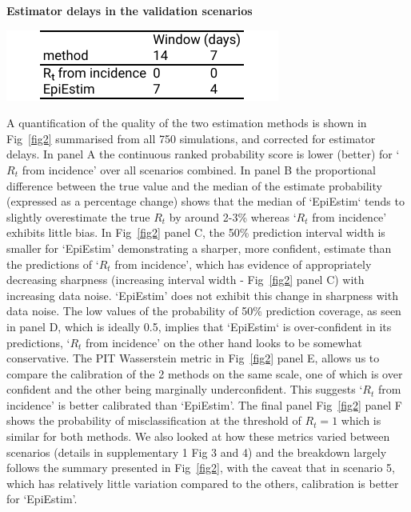 \documentclass[10pt,letterpaper]{article}
\begin{document}
\begin{table}[!ht]
\caption{{\bf Estimator delays in the validation scenarios}}
\centerline{\includegraphics{fig/tab1-lags}}
\label{tab1}
\end{table}

A quantification of the quality of the two estimation methods is shown in Fig~\ref{fig2} summarised from all 750 simulations, and corrected for estimator delays. In panel A the continuous ranked probability score is lower (better) for `$R_t$ from incidence' over all scenarios combined. In panel B the proportional difference between the true value and the median of the estimate probability (expressed as a percentage change) shows that the median of `EpiEstim` tends to slightly overestimate the true $R_t$ by around 2-3\% whereas `$R_t$ from incidence' exhibits little bias. In Fig~\ref{fig2} panel C, the 50\% prediction interval width is smaller for `EpiEstim' demonstrating a sharper, more confident, estimate than the predictions of `$R_t$ from incidence', which has evidence of appropriately decreasing sharpness (increasing interval width - Fig~\ref{fig2} panel C) with increasing data noise. `EpiEstim' does not exhibit this change in sharpness with data noise. The low values of the probability of 50\% prediction coverage, as seen in panel D, which is ideally 0.5, implies that `EpiEstim` is over-confident in its predictions, `$R_t$ from incidence' on the other hand looks to be somewhat conservative. The PIT Wasserstein metric in Fig~\ref{fig2} panel E, allows us to compare the calibration of the 2 methods on the same scale, one of which is over confident and the other being marginally underconfident. This suggests `$R_t$ from incidence' is better calibrated than `EpiEstim'. The final panel Fig~\ref{fig2} panel F shows the probability of misclassification at the threshold of $R_t=1$ which is similar for both methods. We also looked at how these metrics varied between scenarios (details in supplementary 1 Fig 3 and 4) and the breakdown largely follows the summary presented in Fig~\ref{fig2}, with the caveat that in scenario 5, which has relatively little variation compared to the others, calibration is better for `EpiEstim'.
\end{document}
